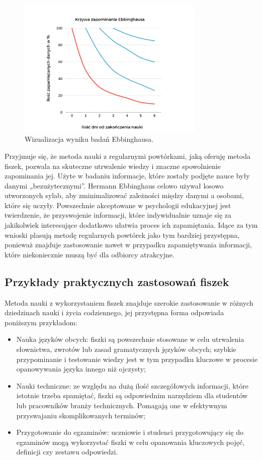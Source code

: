 \begin{figure}[H]
    \centering
    \includegraphics[width=0.8\textwidth]{chapters/chapter_2/krzywa2.png}
    \caption{Wizualizacja wyniku badań Ebbinghausa.}
    \label{img:krzywa2}
\end{figure}


Przyjmuje się, że metoda nauki z regularnymi powtórkami, jaką oferuję metoda fiszek, pozwala na skuteczne utrwalenie wiedzy i znaczne spowolnienie zapominania jej. Użyte w badaniu informacje, które zostały podjęte nauce były danymi „bezużytecznymi”. Hermann Ebbinghaus celowo używał losowo utworzonych sylab, aby zminimalizować zależności między danymi a osobami, które się uczyły. Powszechnie akceptowane w psychologii edukacyjnej jest twierdzenie, że przyswojenie informacji, które indywidualnie uznaje się za jakikolwiek interesujące dodatkowo ułatwia proces ich zapamiętania. Idące za tym wnioski plasują metodę regularnych powtórek jako tym bardziej przystępna, ponieważ znajduje zastosowanie nawet w przypadku zapamiętywania informacji, które niekoniecznie muszą być dla odbiorcy atrakcyjne.

\subsection{Przykłady praktycznych zastosowań fiszek}

Metoda nauki z wykorzystaniem fiszek znajduje szerokie zastosowanie w różnych dziedzinach nauki i życia codziennego, jej przystępna forma odpowiada poniższym przykładom:
\begin{itemize}
    \item Nauka języków obcych: fiszki są powszechnie stosowane w celu utrwalenia słownictwa, zwrotów lub zasad gramatycznych języków obcych; szybkie przypominanie i testowanie wiedzy jest w tym przypadku kluczowe w procesie opanowywania języka innego niż ojczysty;
    \item Nauki techniczne: ze względu na dużą ilość szczegółowych informacji, które istotnie trzeba spamiętać, fiszki są odpowiednim narzędziem dla studentów lub pracowników branży technicznych. Pomagają one w efektywnym przyswajaniu skomplikowanych terminów;
    \item Przygotowanie do egzaminów: uczniowie i studenci przygotowujący się do egzaminów mogą wykorzystać fiszki w celu opanowania kluczowych pojęć, definicji czy zestawu odpowiedzi.
\end{itemize}

